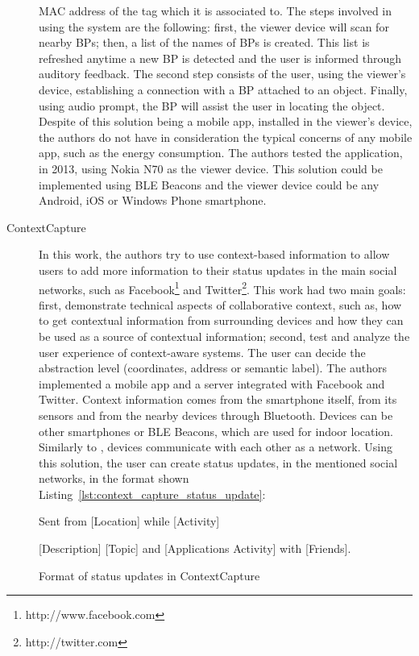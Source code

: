 \begin{description}
  \gls{MAC} address of the tag which it is associated to.
  The steps involved in using the system are the
  following: first, the viewer device will scan
  for nearby \glspl{BP}; then, a list of the names of
  \glspl{BP} is created. This list is refreshed anytime a new
  \gls{BP} is detected and the user is informed through auditory
  feedback. The second step consists of the user, using
  the viewer's device, establishing a connection with a \gls{BP}
  attached to an object. Finally, using audio prompt, the \gls{BP}
  will assist the user in locating the object.
  Despite of this solution being a mobile app, installed
  in the viewer's device, the authors do not have in
  consideration the typical concerns of any mobile app,
  such as the energy consumption.
  The authors tested the application, in 2013,
  using Nokia N70 as the viewer device.
  This solution could be implemented using \gls{BLE} Beacons
  and the viewer device could be any Android, iOS or
  Windows Phone smartphone.
  \item[ContextCapture\cite{Antila2011}]
  In this work, the authors try to use
  context-based information to allow users to
  add more information to their status updates
  in the main social networks, such as
  Facebook\footnote{http://www.facebook.com} and
  Twitter\footnote{http://twitter.com}.
  This work had two main goals: first, demonstrate technical
  aspects of collaborative context, such as,
  how to get contextual information from
  surrounding devices and how they can be used
  as a source of contextual information;
  second, test and analyze the user experience of
  context-aware systems.
  The user can decide the abstraction level (coordinates,
  address or semantic label).
  The authors implemented a mobile app and a
  server integrated with Facebook and Twitter.
  Context information comes from the smartphone itself,
  from its sensors and from the nearby devices through
  Bluetooth.
  Devices can be other smartphones or \gls{BLE} Beacons, which
  are used for indoor location.
  Similarly to \cite{BenAbdesslem2014}, devices communicate
  with each other as a network.
  Using this solution, the user can create status updates,
  in the mentioned social networks, in the format shown Listing~\ref{lst:context_capture_status_update}:
  \begin{listing}

      Sent from [Location] while [Activity]

      [Description] [Topic] and [Applications Activity] with
      [Friends].
    \caption[ContextCapture update]{Format of status updates in ContextCapture}
    \label{lst:context_capture_status_update}
  \end{listing}
\end{description}

